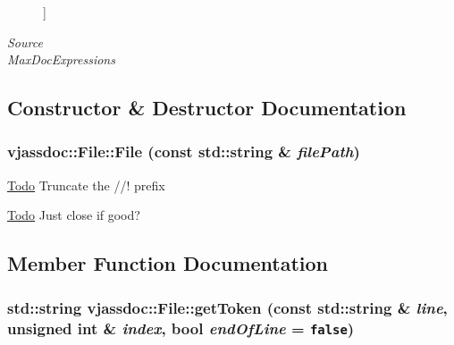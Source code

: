 \begin{Desc}
\begin{description}
{}]\item[{\em 
\hypertarget{classvjassdoc_1_1File_3126530fe28afe1ed99bf67e86a56ab86a0a5002e255e5a3c600139561fc4736}{
Source}
\label{classvjassdoc_1_1File_3126530fe28afe1ed99bf67e86a56ab86a0a5002e255e5a3c600139561fc4736}
}]\item[{\em 
\hypertarget{classvjassdoc_1_1File_3126530fe28afe1ed99bf67e86a56ab8e2ba12169a4184b99fcd6ed350055a58}{
MaxDocExpressions}
\label{classvjassdoc_1_1File_3126530fe28afe1ed99bf67e86a56ab8e2ba12169a4184b99fcd6ed350055a58}
}]\end{description}
\end{Desc}



\subsection{Constructor \& Destructor Documentation}
\hypertarget{classvjassdoc_1_1File_d35f0f273a4e7ecc96e4315edb842151}{
\subsubsection{\setlength{\rightskip}{0pt plus 5cm}vjassdoc::File::File (const std::string \& {\em filePath})}}
\label{classvjassdoc_1_1File_d35f0f273a4e7ecc96e4315edb842151}




\begin{Desc}
\item[\hyperlink{todo__todo000002}{Todo}]Truncate the //! prefix \end{Desc}


\begin{Desc}
\item[\hyperlink{todo__todo000002}{Todo}]Just close if good? \end{Desc}


\subsection{Member Function Documentation}
\hypertarget{classvjassdoc_1_1File_424079db72abbc4c6812691748c10362}{
\subsubsection{\setlength{\rightskip}{0pt plus 5cm}std::string vjassdoc::File::getToken (const std::string \& {\em line}, unsigned int \& {\em index}, bool {\em endOfLine} = {\tt false})}}
\label{classvjassdoc_1_1File_424079db72abbc4c6812691748c10362}




